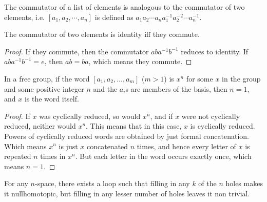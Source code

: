 \begin{defn}
The commutator of a list of elements is analogous to the commutator of two elements, i.e. $[a_1, a_2, \cdots, a_n]$ is defined as $a_1a_2\cdots a_na_1^{-1}a_2^{-2}\cdots a_n^{-1}$.
\end{defn}

\begin{lem}
The commutator of two elements is identity iff they commute.
\end{lem}

\begin{proof}
If they commute, then the commutator $aba^{-1}b^{-1}$ reduces to identity. If $aba^{-1}b^{-1}=e$, then $ab=ba$, which means they commute. 
\end{proof}

\begin{lem}\label{impo2}
In a free group, if the word $[a_1, a_2, \ldots, a_m]$ ($m>1$) is $x^n$ for some $x$ in the group and some positive integer $n$ and the $a_i$s are members of the basis, then $n=1$, and $x$ is the word itself.
\end{lem}

\begin{proof}
If $x$ was cyclically reduced, so would $x^n$, and if $x$ were not cyclically reduced, neither would $x^n$. This means that in this case, $x$ is cyclically reduced. Powers of cyclically reduced words are obtained by just formal concatenation. Which means $x^n$ is just $x$ concatenated $n$ times, and hence every letter of $x$ is repeated $n$ times in $x^n$. But each letter in the word occurs exactly once, which means $n=1$.
\end{proof}

\begin{thm}
For any $n$-space, there exists a loop such that filling in any $k$ of the $n$ holes makes it nullhomotopic, but filling in any lesser number of holes leaves it non trivial.
\end{thm}

